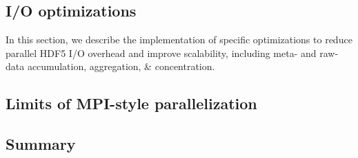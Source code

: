 \subsection{I/O optimizations}

In this section, we describe the implementation of specific optimizations to reduce parallel HDF5 I/O overhead and improve scalability, including meta- and raw-data accumulation, aggregation, \& concentration.

\subsection{Limits of MPI-style parallelization}


\subsection{Summary}
